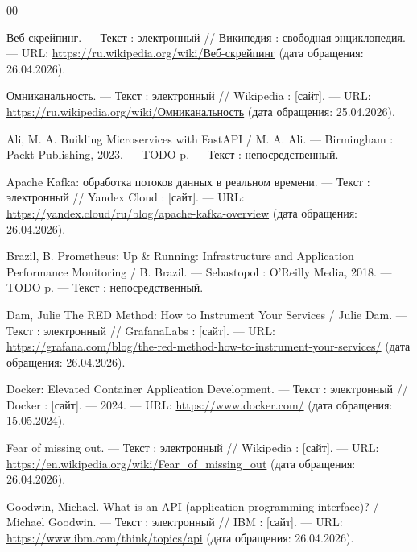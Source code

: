 \begin{thebibliography}{00}


    \hypertarget{web_scrapping}{}
    Веб-скрейпинг. — Текст : электронный // Википедия : свободная энциклопедия. — URL: \href{https://ru.wikipedia.org/wiki/Веб-скрейпинг}{https://ru.wikipedia.org/wiki/Веб-скрейпинг} (дата обращения: 26.04.2026).

    \hypertarget{omnichannel_def}{}
    Омниканальность. — Текст : электронный // Wikipedia : [сайт]. — URL: \href{https://ru.wikipedia.org/wiki/Омниканальность}{https://ru.wikipedia.org/wiki/Омниканальность} (дата обращения: 25.04.2026).


    Ali, M. A. Building Microservices with FastAPI / M. A. Ali. — Birmingham : Packt Publishing, 2023. — TODO p. — Текст : непосредственный.

    Apache Kafka: обработка потоков данных в реальном времени. — Текст : электронный // Yandex Cloud : [сайт]. — URL: \url{https://yandex.cloud/ru/blog/apache-kafka-overview} (дата обращения: 26.04.2026).

    Brazil, B. Prometheus: Up \& Running: Infrastructure and Application Performance Monitoring / B. Brazil. — Sebastopol : O'Reilly Media, 2018. — TODO p. — Текст : непосредственный.

    Dam, Julie The RED Method: How to Instrument Your Services / Julie Dam. — Текст : электронный // GrafanaLabs : [сайт]. — URL: \url{https://grafana.com/blog/the-red-method-how-to-instrument-your-services/} (дата обращения: 26.04.2026).

    Docker: Elevated Container Application Development. — Текст : электронный // Docker : [сайт]. — 2024. — URL: \url{https://www.docker.com/} (дата обращения: 15.05.2024).

    Fear of missing out. — Текст : электронный // Wikipedia : [сайт]. — URL: \url{https://en.wikipedia.org/wiki/Fear_of_missing_out} (дата обращения: 26.04.2026).

    \hypertarget{api_def}{}
    Goodwin, Michael. What is an API (application programming interface)? / Michael Goodwin. — Текст : электронный // IBM : [сайт]. — URL: \url{https://www.ibm.com/think/topics/api} (дата обращения: 26.04.2026).


\end{thebibliography}

